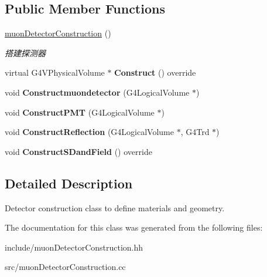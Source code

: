 \subsection*{Public Member Functions}
\begin{DoxyCompactItemize}
\item 
\mbox{\label{classmuonDetectorConstruction_ad2b397202446a2fb7d563a8122cd5ecc}} 
\hyperlink{classmuonDetectorConstruction_ad2b397202446a2fb7d563a8122cd5ecc}{muon\+Detector\+Construction} ()
\begin{DoxyCompactList}\small\item\em 搭建探测器 \end{DoxyCompactList}\item 
\mbox{\label{classmuonDetectorConstruction_ae06d0e4ad5f07bc1465a7faeccfdd19d}} 
virtual G4\+V\+Physical\+Volume $\ast$ {\bfseries Construct} () override
\item 
\mbox{\label{classmuonDetectorConstruction_a1f76a4cb61622b57c22e2041afb96181}} 
void {\bfseries Constructmuondetector} (G4\+Logical\+Volume $\ast$)
\item 
\mbox{\label{classmuonDetectorConstruction_aa5c57ff26fa5e8339698103cf5422dd8}} 
void {\bfseries Construct\+P\+MT} (G4\+Logical\+Volume $\ast$)
\item 
\mbox{\label{classmuonDetectorConstruction_a01081b09828848dd76666d4e59cbab52}} 
void {\bfseries Construct\+Reflection} (G4\+Logical\+Volume $\ast$, G4\+Trd $\ast$)
\item 
\mbox{\label{classmuonDetectorConstruction_ab730c9af042466f6464c77a62a3c75df}} 
void {\bfseries Construct\+S\+Dand\+Field} () override
\end{DoxyCompactItemize}


\subsection{Detailed Description}
Detector construction class to define materials and geometry. 

The documentation for this class was generated from the following files\+:\begin{DoxyCompactItemize}
\item 
include/muon\+Detector\+Construction.\+hh\item 
src/muon\+Detector\+Construction.\+cc\end{DoxyCompactItemize}

